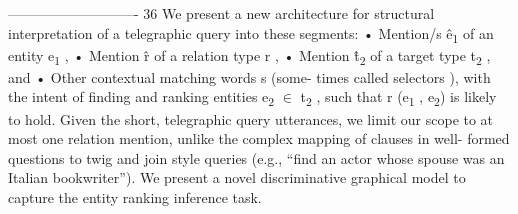 ----------------------------
36
We  present  a  new  architecture  for  structural  interpretation of a telegraphic query into these segments:
•
Mention/s
\^{e\textsubscript{1}}
of an entity
e\textsubscript{1}
,
•
Mention
\^{r}
of a relation type
r
,
•
Mention
\^{t\textsubscript{2}}
of a target type
t\textsubscript{2}
, and
•
Other  contextual  matching  words
s
(some-
times called
selectors
),
with the intent of finding and ranking entities
e\textsubscript{2} $ \in $
t\textsubscript{2}
,  such that
r
(e\textsubscript{1}
, e\textsubscript{2})
is likely
to hold.
Given  the  short,  telegraphic  query  utterances,
we limit our scope to at most one relation mention,
unlike  the  complex  mapping  of  clauses  in  well-
formed  questions  to  twig  and  join  style  queries
(e.g., “find an actor whose spouse was an Italian
bookwriter”). We  present  a  novel  discriminative  graphical
model to capture the entity ranking inference task.

